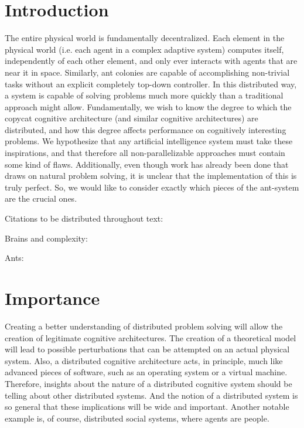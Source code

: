 \documentclass{nature}
\begin{document}
\section{Introduction}

    The entire physical world is fundamentally decentralized. 
    Each element in the physical world (i.e. each agent in a complex adaptive system) computes itself, independently of each other element, and only ever interacts with agents that are near it in space. 
    Similarly, ant colonies are capable of accomplishing non-trivial tasks without an explicit completely top-down controller.
    In this distributed way, a system is capable of solving problems much more quickly than a traditional approach might allow.
    Fundamentally, we wish to know the degree to which the copycat cognitive architecture (and similar cognitive architectures) are distributed, and how this degree affects performance on cognitively interesting problems.
    We hypothesize that any artificial intelligence system must take these inspirations, and that therefore all non-parallelizable approaches must contain some kind of flaws.
    Additionally, even though work has already been done that draws on natural problem solving, it is unclear that the implementation of this is truly perfect.
    So, we would like to consider exactly which pieces of the ant-system are the crucial ones. 

    Citations to be distributed throughout text:

    Brains and complexity:
    \cite{koch_1999}
    \cite{sporns_2004}
    \cite{watts_strogatz_2011}

    Ants:
    \cite{dorigo_maniezzo_colorni_1996}
    \cite{fewell_2003}

\section{Importance}

    Creating a better understanding of distributed problem solving will allow the creation of legitimate cognitive architectures. 
    The creation of a theoretical model will lead to possible perturbations that can be attempted on an actual physical system.
    Also, a distributed cognitive architecture acts, in principle, much like advanced pieces of software, such as an operating system or a virtual machine.
    Therefore, insights about the nature of a distributed cognitive system should be telling about other distributed systems. 
    And the notion of a distributed system is so general that these implications will be wide and important.
    Another notable example is, of course, distributed social systems, where agents are people.
\end{document}
